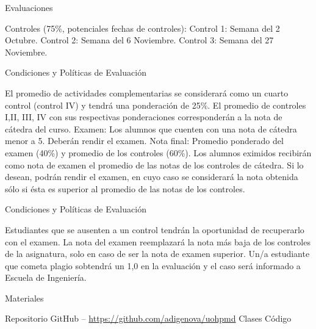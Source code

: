 \documentclass{beamer}
\begin{document}
  \begin{frame}{Evaluaciones}
  \begin{outline}
  	
  	\1 Controles (75\%, potenciales fechas de controles):
	\2 Control 1:  Semana del 2 Octubre.
	\2 Control 2:  Semana del 6 Noviembre.
	\2 Control 3:  Semana del 27 Noviembre.

	
  \end{outline}
  \end{frame}
  
  \begin{frame}{Condiciones y Políticas de Evaluación}
  \small
  \begin{outline}
   \1 El promedio de actividades complementarias se considerará como un cuarto control (control IV) y tendrá una ponderación de 25\%. El promedio de controles I,II, III, IV con sus respectivas ponderaciones corresponderán a la nota de cátedra del curso. 
   \1  Examen:  Los alumnos que cuenten con una nota de cátedra menor a 5. Deberán rendir el examen.
   \1 Nota final: Promedio ponderado del examen (40\%) y promedio de los controles (60\%). 
    \1 Los alumnos eximidos recibirán como nota de examen el promedio de las notas de los controles de cátedra. Si lo desean, podrán rendir el examen, en cuyo caso se considerará la nota obtenida sólo si ésta es superior al promedio de las notas de los controles.
  \end{outline}
  \end{frame}
  
  \begin{frame}{Condiciones y Políticas de Evaluación}
  \small
  \begin{outline}      
   \1 Estudiantes que se ausenten a un control tendrán la oportunidad de recuperarlo con el examen. La nota del examen reemplazará la nota más baja de los controles de la asignatura, solo en caso de ser la nota de examen superior.
     \1 Un/a estudiante que cometa plagio sobtendrá un 1,0 en la evaluación y el caso será informado a Escuela de Ingeniería.
  \end{outline}
  \end{frame}

    
  \begin{frame}{Materiales}
  \begin{outline}
  \1 Repositorio GitHub -- \url{https://github.com/adigenova/uohpmd}
  \2 Clases
  \2 Código 
  \end{outline}
  \end{frame} 
  
\end{document}
